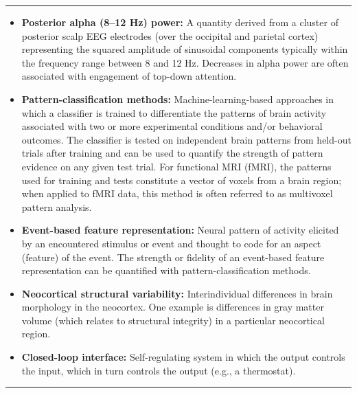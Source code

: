 \begin{table}[ht!]
	\captionsetup{justification=raggedright,singlelinecheck=off}
	\caption{Glossary}
	\label{tab:glossary}
	\noindent\rule{\linewidth}{0.4pt}
	\begin{itemize}
		\item \textbf{Posterior alpha (8--12 Hz) power:} A quantity derived from a cluster of posterior scalp EEG electrodes (over the occipital and parietal cortex) representing the squared amplitude of sinusoidal components typically within the frequency range between 8 and 12 Hz. Decreases in alpha power are often associated with engagement of top-down attention.
		\item \textbf{Pattern-classification methods:} Machine-learning-based approaches in which a classifier is trained to differentiate the patterns of brain activity associated with two or more experimental conditions and/or behavioral outcomes. The classifier is tested on independent brain patterns from held-out trials after training and can be used to quantify the strength of pattern evidence on any given test trial. For functional MRI (fMRI), the patterns used for training and tests constitute a vector of voxels from a brain region; when applied to fMRI data, this method is often referred to as multivoxel pattern analysis.
		\item \textbf{Event-based feature representation:} Neural pattern of activity elicited by an encountered stimulus or event and thought to code for an aspect (feature) of the event. The strength or fidelity of an event-based feature representation can be quantified with pattern-classification methods.
		\item \textbf{Neocortical structural variability:} Interindividual differences in brain morphology in the neocortex. One example is differences in gray matter volume (which relates to structural integrity) in a particular neocortical region.
		\item \textbf{Closed-loop interface:} Self-regulating system in which the output controls the input, which in turn controls the output (e.g., a thermostat).
	\end{itemize}
	\noindent\rule{\linewidth}{0.4pt}
\end{table}

